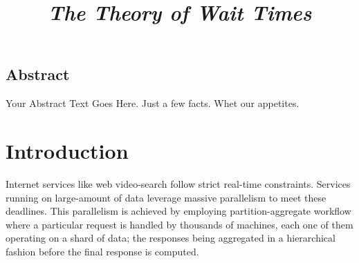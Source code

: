 \documentclass[letterpaper,twocolumn,10pt]{article}
\begin{document}
\newcommand{\notegk}[1]{\textcolor{red}{[G: #1]}}
\newcommand{\noteion}[1]{\textcolor{blue}{[I: #1]}}
\date{}

\title{\huge \textit{The Theory of Wait Times}}


\maketitle



\subsection*{Abstract}
Your Abstract Text Goes Here.  Just a few facts.
Whet our appetites.

\section{Introduction}

Internet services like web video-search follow strict real-time constraints. 
Services running on large-amount of data leverage massive parallelism to meet these deadlines. 
This parallelism is achieved by employing partition-aggregate workflow where a particular request is handled by thousands of machines, 
each one of them operating on a shard of data; the responses being aggregated 
in a hierarchical fashion before the final response is computed.
\end{document}
